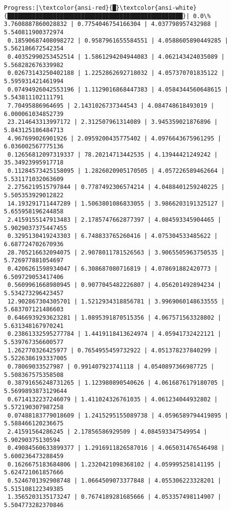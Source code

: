 \documentclass[11pt]{article}
\begin{document}
    \begin{Verbatim}[commandchars=\\\{\}]
 Progress:|\textcolor{ansi-red}{█}\textcolor{ansi-white}{██████████████████████████████████████████████████}| 0.0\% 3.7608887860028832 | 0.7754046754166304 | 4.037798957432988 | 5.540811900372974
 0.18590687408098272 | 0.9587961655584551 | 4.0588605890449285 | 5.562186672542354
 0.40352990253452514 | 1.5861294204944083 | 4.062143424035089 | 5.568282676339982
 0.02673143250402188 | 1.2252862692718032 | 4.057370701835122 | 5.595931421461994
 0.07494926042553196 | 1.1129016868447383 | 4.0584344560648615 | 5.543811102111791
 7.70495886964695 | 2.1431026737344543 | 4.084748618493019 | 6.000061034852739
 23.214643313997172 | 2.312507961314089 | 3.945359021876896 | 5.843125186484713
 4.967699026901926 | 2.0959200435775402 | 4.0976643675961295 | 6.036002567775136
 0.12656812097319337 | 78.20214713442535 | 4.13944421249242 | 35.34923995917718
 0.11284573425158095 | 1.2826020905170505 | 4.057226589462664 | 5.531171032063609
 2.2756219515797844 | 0.7787492306574214 | 4.0488401259240225 | 5.505353929012822
 14.193291711447289 | 1.5063801086833055 | 3.9866203191325127 | 5.655958196244858
 2.4159155147913483 | 2.1785747662877397 | 4.084593345904465 | 5.9029037375447455
 0.3295130419243303 | 6.748833765260416 | 4.075304533485622 | 6.687724702670936
 28.705216632094075 | 2.9078011781526563 | 3.9065505963750535 | 5.726977881054697
 0.4206261598934047 | 6.308687080716819 | 4.078691882420773 | 6.509729053417406
 0.5609961668980945 | 0.9077045482226807 | 4.056201492894234 | 5.534273296423457
 12.902867304305701 | 1.5212934318856781 | 3.9969060148633555 | 5.683707121486603
 0.6466939293623281 | 1.0895391870515356 | 4.067571563328802 | 5.631348167970241
 0.23861332595277784 | 1.4419118413624974 | 4.05941732422121 | 5.539767356600577
 1.262770326425977 | 0.7654955459732922 | 4.051378237840299 | 5.5226386193337005
 0.78069033527987 | 0.991407923741118 | 4.0540897366987725 | 5.508367575358508
 0.38791656248731265 | 1.123980890540626 | 4.0616876179180705 | 5.5699893873129644
 0.6714132237246079 | 1.411024326761035 | 4.061234044932802 | 5.572190307987258
 0.07488183779018609 | 1.2415295155089738 | 4.0596589794419895 | 5.588466120236675
 2.41591564286245 | 2.17856586929509 | 4.084593347549954 | 5.90290375130594
 0.49084560633899377 | 1.2916911826587016 | 4.065031476546498 | 5.600236473288459
 0.1626675183684806 | 1.2320421098368102 | 4.059995258141195 | 5.624721061857666
 0.5246701392908748 | 1.0664509073377848 | 4.055306223328201 | 5.515108122349385
 1.3565203135173247 | 0.7674189281685666 | 4.053357498114907 | 5.504773282370846

\end{Verbatim}
\end{document}

